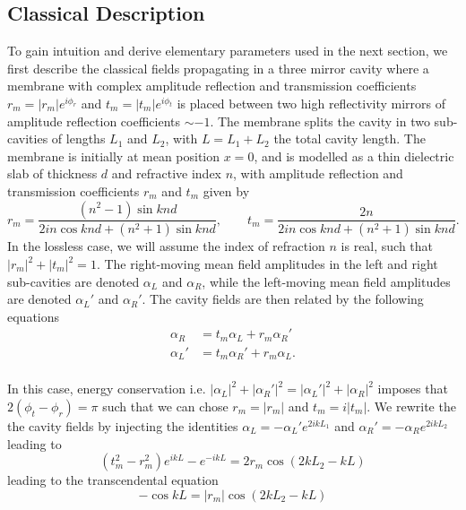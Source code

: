 \subsection{Classical Description}
To gain intuition and derive elementary parameters used in the next section, we first describe the classical fields propagating in a three mirror cavity where a membrane with complex amplitude reflection and transmission coefficients \(r_m=|r_m|e^{i\phi_r}\) and \(t_m=|t_m|e^{i\phi_t}\) is placed between two high reflectivity mirrors of amplitude reflection coefficients \( \sim -1 \). The membrane splits the cavity in two sub-cavities of lengths \(L_1\) and \(L_2\), with \(L=L_1+L_2\) the total cavity length. The membrane is initially at mean position $x=0$, and is modelled as a thin dielectric slab of thickness \(d\) and refractive index \(n\), with amplitude reflection and transmission coefficients \(r_m\) and \(t_m\) given by \cite{thompson_strong_2008}
\begin{equation}
r_m = \frac{(n^2-1)\sin k n d}{2 i n \cos k n d  + (n^2+1)\sin k n d}, \qquad t_m = \frac{2 n}{2 i n \cos k n d  + (n^2+1)\sin k n d}. 
\end{equation}
In the lossless case, we will assume the index of refraction $n$ is real, such that \(|r_m|^2 + |t_m|^2 = 1\). The right-moving mean field amplitudes in the left and right sub-cavities are denoted \(\alpha_L\) and \(\alpha_R\), while the left-moving mean field amplitudes are denoted \(\alpha_L'\) and \(\alpha_R'\). The cavity fields are then related by the following equations
\begin{equation}
\begin{split}
\alpha_R  &= t_m \alpha_L + r_m \alpha_R' \\
\alpha_L' &= t_m \alpha_R'+ r_m \alpha_L. \\
\end{split}
\end{equation}

In this case, energy conservation i.e. $|\alpha_L|^2 + |\alpha_R'|^2 = |\alpha_L'|^2 + |\alpha_R|^2$ imposes that $2(\phi_t-\phi_r) = \pi$ such that we can chose $r_m = |r_m|$ and $t_m = i|t_m|$. We rewrite the the cavity fields by injecting the identities $\alpha_L = - \alpha_L' e^{2ikL_1}$ and $\alpha_R' = - \alpha_R e^{2ikL_2}$ leading to
\begin{equation}
   (t_m^2 - r_m^2) e^{ikL} - e^{-ikL}  = 2 r_m \cos(2kL_2 - kL )
\end{equation}
leading to the transcendental equation \cite{jayich_dispersive_2008}
\begin{equation}
  -\cos kL = |r_m|\cos (2kL_2 - kL)
\end{equation}

